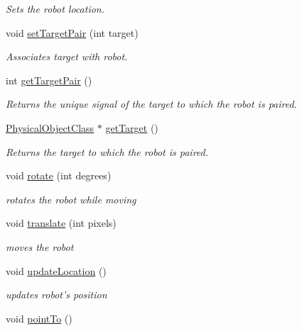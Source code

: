 \begin{DoxyCompactItemize}
\begin{DoxyCompactList}\small\item\em Sets the robot location. \end{DoxyCompactList}\item 
void \hyperlink{classRobotClass_a846281a36ffd93349b2d9df7ef009ba5}{set\-Target\-Pair} (int target)
\begin{DoxyCompactList}\small\item\em Associates target with robot. \end{DoxyCompactList}\item 
int \hyperlink{classRobotClass_a6917e8e0466c4fe0e6827d2c1542c012}{get\-Target\-Pair} ()
\begin{DoxyCompactList}\small\item\em Returns the unique signal of the target to which the robot is paired. \end{DoxyCompactList}\item 
\hyperlink{classPhysicalObjectClass}{Physical\-Object\-Class} $\ast$ \hyperlink{classRobotClass_a12c66f3be1dd345448398e811ebc5787}{get\-Target} ()
\begin{DoxyCompactList}\small\item\em Returns the target to which the robot is paired. \end{DoxyCompactList}\item 
void \hyperlink{classRobotClass_af0a67d59620139069f981da208a7a28d}{rotate} (int degrees)
\begin{DoxyCompactList}\small\item\em rotates the robot while moving \end{DoxyCompactList}\item 
\hypertarget{classRobotClass_aea48d75ac942eef8e7d0891784f48e0b}{void \hyperlink{classRobotClass_aea48d75ac942eef8e7d0891784f48e0b}{translate} (int pixels)}\label{classRobotClass_aea48d75ac942eef8e7d0891784f48e0b}

\begin{DoxyCompactList}\small\item\em moves the robot \end{DoxyCompactList}\item 
\hypertarget{classRobotClass_a1ce57ed179b9816eb492613bcfd65afb}{void \hyperlink{classRobotClass_a1ce57ed179b9816eb492613bcfd65afb}{update\-Location} ()}\label{classRobotClass_a1ce57ed179b9816eb492613bcfd65afb}

\begin{DoxyCompactList}\small\item\em updates robot's position \end{DoxyCompactList}\item 
\hypertarget{classRobotClass_a5de1615cb1128b98a87cbba7933c11c6}{void \hyperlink{classRobotClass_a5de1615cb1128b98a87cbba7933c11c6}{point\-To} ()}\label{classRobotClass_a5de1615cb1128b98a87cbba7933c11c6}


\end{DoxyCompactItemize}
